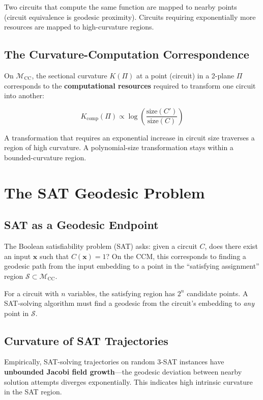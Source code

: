 \documentclass{article}
\begin{document}
Two circuits that compute the same function are mapped to nearby points
(circuit equivalence is geodesic proximity).  Circuits requiring
exponentially more resources are mapped to high-curvature regions.

\subsection{The Curvature-Computation Correspondence}

On $\mathcal{M}_{\text{CC}}$, the sectional curvature $K(\Pi)$ at a point
(circuit) in a 2-plane $\Pi$ corresponds to the \textbf{computational
resources} required to transform one circuit into another:

\begin{equation}
K_{\text{comp}}(\Pi) \propto \log\left(\frac{\text{size}(C')}{\text{size}(C)}\right)
\end{equation}

A transformation that requires an exponential increase in circuit size
traverses a region of high curvature.  A polynomial-size transformation
stays within a bounded-curvature region.

\section{The SAT Geodesic Problem}
\label{sec:sat-geodesic}

\subsection{SAT as a Geodesic Endpoint}

The Boolean satisfiability problem (SAT) asks: given a circuit $C$, does
there exist an input $\mathbf{x}$ such that $C(\mathbf{x}) = 1$?  On the
CCM, this corresponds to finding a geodesic path from the input embedding
to a point in the ``satisfying assignment'' region $\mathcal{S} \subset
\mathcal{M}_{\text{CC}}$.

For a circuit with $n$ variables, the satisfying region has $2^n$ candidate
points.  A SAT-solving algorithm must find a geodesic from the circuit's
embedding to \emph{any} point in $\mathcal{S}$.

\subsection{Curvature of SAT Trajectories}

Empirically, SAT-solving trajectories on random 3-SAT instances have
\textbf{unbounded Jacobi field growth}---the geodesic deviation between
nearby solution attempts diverges exponentially.  This indicates high
intrinsic curvature in the SAT region.
\end{document}
